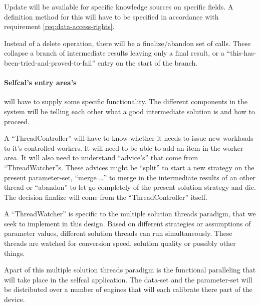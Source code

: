 \documentclass[]{lofar}
\begin{document}
        Update will be available for specific knowledge sources on
        specific fields. A definition method for this will have to be
        specified in accordance with requirement
        \hyperlink{req:data-access-rights}{\ref{req:data-access-rights}}.

        Instead of a delete operation, there will be a
        finalize/abandon set of calls. These collapse a branch of
        intermediate results leaving only a final result, or a
        ``this-has-been-tried-and-proved-to-fail'' entry on the start
        of the branch.

        \paragraph{Selfcal's entry area's} will have to supply some
          specific functionality. The different components in the
          system will be telling each other what a good intermediate
          solution is and how to proceed.

          A ``ThreadController''  will have to know whether it needs to issue new
          workloads to it's controlled workers. It will need to be
          able to add an item in the worker-area. It will also need to
          understand ``advice's'' that come from
          ``ThreadWatcher''s. These advices might be ``split'' to
          start a new strategy on the present parameter-set, ``merge
          \ldots'' to merge in the intermediate results of an other
          thread or ``abandon'' to let go completely of the present
          solution strategy and die. The decision finalize will come
          from the ``ThreadController'' itself.

          A ``ThreadWatcher''  is
          specific to the multiple solution threads paradigm, that we
          seek to implement in this design. Based on different
          strategies or assumptions of parameter values, different
          solution threads can run
          simultaneously. These threads are watched for conversion
          speed, solution quality or possibly other things.

          Apart of this multiple solution threads paradigm is the
          functional paralleling that will take place in the selfcal
          application. The data-set and the parameter-set will be
          distributed over a number of engines that will each
          calibrate there part of the device.
\end{document}
